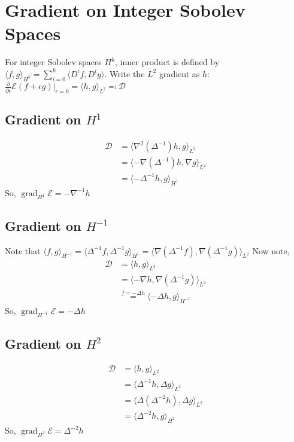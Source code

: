 \documentclass[a4paper]{article}
\theoremstyle{definition}
\newcommand{\inner}[2]{\langle #1, #2 \rangle}
\DeclareMathOperator{\grad}{grad}
\begin{document}
\section{Gradient on Integer Sobolev Spaces}
For integer Sobolev spaces $H^k$, inner product is defined by $\inner{f}{g}_{H^k} = \sum_{i=0}^{k} \inner{D^i f}{D^i g}$.
Write the $L^2$ gradient as $h$: $\frac{\partial}{\partial \epsilon} \mathcal{E} (f+\epsilon g) |_{\epsilon = 0} = \inner{h}{g}_{L^2} \eqqcolon \mathcal{D}$
\subsection{Gradient on $H^1$}
\begin{align}
    \mathcal{D} &= \inner{\nabla^2 (\Delta^{-1})h}{g}_{L^2} \\
    &= \inner{-\nabla \left( \Delta^{-1} \right)h }{\nabla g}_{L^2} \\
    &= \inner{- \Delta^{-1} h}{g}_{H^1}
\end{align}
So, $\grad_{H^1} \mathcal{E} = -\nabla^{-1} h$

\subsection{Gradient on $H^{-1}$}
Note that $\inner{f}{g}_{H^{-1}} = \inner{\Delta^{-1} f}{\Delta^{-1} g}_{H^1} = \inner{\nabla \left( \Delta^{-1} f \right)}{\nabla \left( \Delta^{-1} g \right)}_{L^2}$
Now note,
\begin{align}
    \mathcal{D} &= \inner{h}{g}_{L^2} \\
    &= \inner{-\nabla h}{\nabla \left( \Delta^{-1} g \right)}_{L^2} \\
    &\stackrel{f=-\Delta h}{=} \inner{-\Delta h}{g}_{H^{-1}}
\end{align}
So, $\grad_{H^{-1}} \mathcal{E} = -\Delta h$

\subsection{Gradient on $H^2$}
\begin{align}
    \mathcal{D} &= \inner{h}{g}_{L^2} \\
    &= \inner{\Delta^{-1} h}{\Delta g}_{L^2} \\
    &= \inner{\Delta \left( \Delta^{-2} h \right)}{\Delta g}_{L^2} \\
    &= \inner{\Delta^{-2} h}{g}_{H^2}
\end{align}
So, $\grad_{H^2} \mathcal{E} = \Delta^{-2} h$
\end{document}
